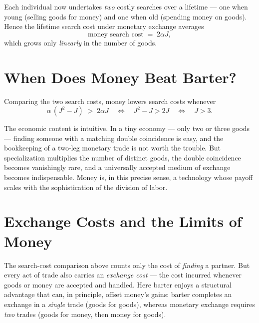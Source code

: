 Each individual now undertakes \emph{two} costly searches over a lifetime --- one when young (selling goods for money) and one when old (spending money on goods). Hence the lifetime search cost under monetary exchange averages
\[
\text{money search cost} \;=\; 2\alpha J,
\]
which grows only \emph{linearly} in the number of goods.

\section{When Does Money Beat Barter?}

Comparing the two search costs, money lowers search costs whenever
\[
\alpha\,(J^2 - J) \;>\; 2\alpha J
\quad\Longleftrightarrow\quad
J^2 - J > 2J
\quad\Longleftrightarrow\quad
J > 3 .
\]



The economic content is intuitive. In a tiny economy --- only two or three goods --- finding someone with a matching double coincidence is easy, and the bookkeeping of a two-leg monetary trade is not worth the trouble. But specialization multiplies the number of distinct goods, the double coincidence becomes vanishingly rare, and a universally accepted medium of exchange becomes indispensable. Money is, in this precise sense, a technology whose payoff scales with the sophistication of the division of labor.

\section{Exchange Costs and the Limits of Money}

The search-cost comparison above counts only the cost of \emph{finding} a partner. But every act of trade also carries an \emph{exchange cost} --- the cost incurred whenever goods or money are accepted and handled. Here barter enjoys a structural advantage that can, in principle, offset money's gains: barter completes an exchange in a \emph{single} trade (goods for goods), whereas monetary exchange requires \emph{two} trades (goods for money, then money for goods).


